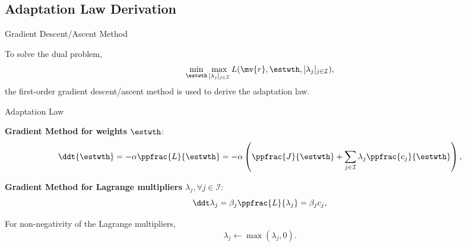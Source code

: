 \documentclass[8pt, aspectratio=169]{beamer}
\newcommand{\ctxt}[2]{\color{#1}{#2}\color{black} }
\begin{document}
\subsection{Adaptation Law Derivation}

\begin{frame}{\insertsubsectionhead}{Gradient Descent/Ascent Method}
  
  To solve the dual problem, 
  \begin{equation}
    \min_{\estwth}\max_{[\lambda_j]_{j\in\mathcal{I}}} 
    L(\mv{r},\estwth,[\lambda_j]_{j\in\mathcal{I}})
    ,
  \end{equation}
  the first-order gradient descent/ascent method is used to derive the adaptation law.

  \centering
  \begin{minipage}{0.6\textwidth}%

    \begin{block}{Adaptation Law}%
      
    {
      \textbf{Gradient \ctxt{airforceblue}{Descent } Method for weights $\estwth$}:
      \begin{equation}\label{eq:adaptation_law:1}
        \ddt {{\estwth}}
        =
        -\alpha 
        \ppfrac{L}{{\estwth}}
        =-\alpha 
        \left(
            \ppfrac{J}{{\estwth}}
            +
            \sum_{j\in\mathcal{I}}
            \lambda_j 
            \ppfrac{c_j}{\estwth}
        \right),
      \end{equation}
    }

    {
      \textbf{Gradient \ctxt{awesome}{Ascent } Method for Lagrange multipliers $\lambda_j, \forall j\in\mathcal I$}:
      \begin{equation}\label{eq:adaptation_law:2}
        \ddt\lambda_j
        = 
        \beta_j
        \ppfrac{L}{\lambda_j} 
        = 
        \beta_j c_j ,
      \end{equation}
    }

    {
      For non-negativity of the Lagrange multipliers,
      \begin{equation}\label{eq:adaptation_law:3}
        \lambda_j
        \leftarrow
        \max(\lambda_j,0)
        .
      \end{equation}
    }

    \end{block}
  \end{minipage}
\end{frame}
\end{document}
